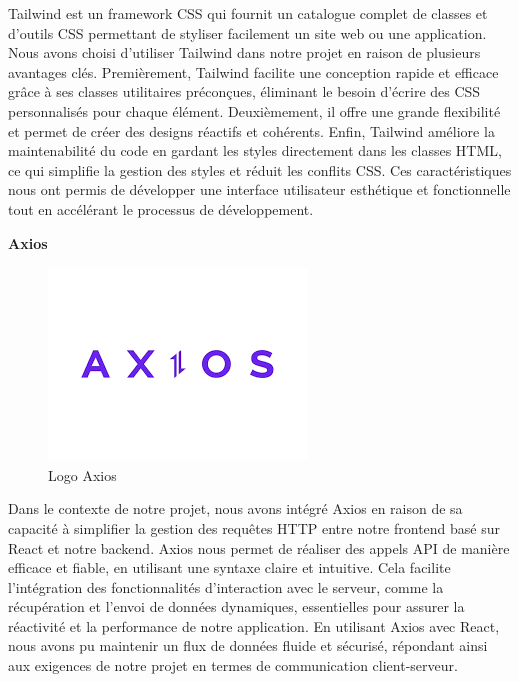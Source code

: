 Tailwind est un framework CSS qui fournit un catalogue complet 
de classes et d’outils CSS permettant de styliser facilement un 
site web ou une application. Nous avons choisi d'utiliser 
Tailwind dans notre projet en raison de plusieurs avantages 
clés. Premièrement, Tailwind facilite une conception rapide et 
efficace grâce à ses classes utilitaires préconçues, éliminant 
le besoin d'écrire des CSS personnalisés pour chaque élément. 
Deuxièmement, il offre une grande flexibilité et permet de créer 
des designs réactifs et cohérents. Enfin, Tailwind améliore 
la maintenabilité du code en gardant les styles directement dans 
les classes HTML, ce qui simplifie la gestion des styles et 
réduit les conflits CSS\cite{Tailwind}. Ces caractéristiques nous ont permis de 
développer une interface utilisateur esthétique et fonctionnelle 
tout en accélérant le processus de développement.
\newline

\large
\textbf{Axios}
\begin{figure}[h]
   \centering
   \includegraphics[scale=0.5]{Images/axios.png}
   \caption{Logo Axios}
\end{figure}

Dans le contexte de notre projet, nous avons intégré Axios en 
raison de sa capacité à simplifier la gestion des requêtes HTTP 
entre notre frontend basé sur React et notre backend. Axios nous 
permet de réaliser des appels API de manière efficace et fiable, 
en utilisant une syntaxe claire et intuitive. Cela facilite 
l'intégration des fonctionnalités d'interaction avec le serveur, 
comme la récupération et l'envoi de données dynamiques, 
essentielles pour assurer la réactivité et la performance de 
notre application. En utilisant Axios avec React, nous avons 
pu maintenir un flux de données fluide et sécurisé, répondant 
ainsi aux exigences de notre projet en termes de communication 
client-serveur.
\newline

